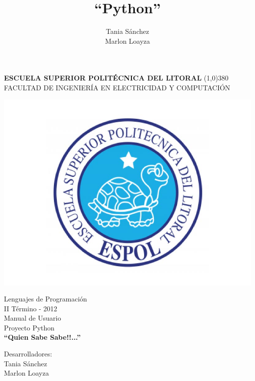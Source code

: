 \documentclass[a4paper,11pt]{article}
\title{``Python''}
\author{Tania S\'{a}nchez\\ Marlon Loayza}
\begin{document}
\setlength{\topmargin}{0.5in}
			\pagestyle{empty}
			\begin{center}
				\textbf{
					\vspace{-0.7em}
					ESCUELA SUPERIOR POLIT\'{E}CNICA DEL LITORAL
				}
				\line(1,0){380}\\		
				\scriptsize{FACULTAD DE INGENIER\'{I}A EN ELECTRICIDAD Y COMPUTACI\'{O}N}
				
				\vspace{2.5em}
				\includegraphics[scale=0.2]{images/logo_espol.jpg} 
			\end{center}
			
			\begin{center}
				\vspace{2.5em}
				Lenguajes de Programaci\'{o}n
				\\II T\'{e}rmino - 2012
				\vspace{1.5em}  %
				\\Manual de Usuario \\Proyecto Python\\
				\vspace{5em}
				\Huge{\textbf{``Quien Sabe Sabe!!...''	\vspace{3em}}}
			\end{center}	
			
			


				\hspace*{5cm}Desarrolladores:
				\vspace{1.5em}
				\\\hspace*{8cm}Tania S\'{a}nchez
				\\\hspace*{8cm}Marlon Loayza 
\end{document}
